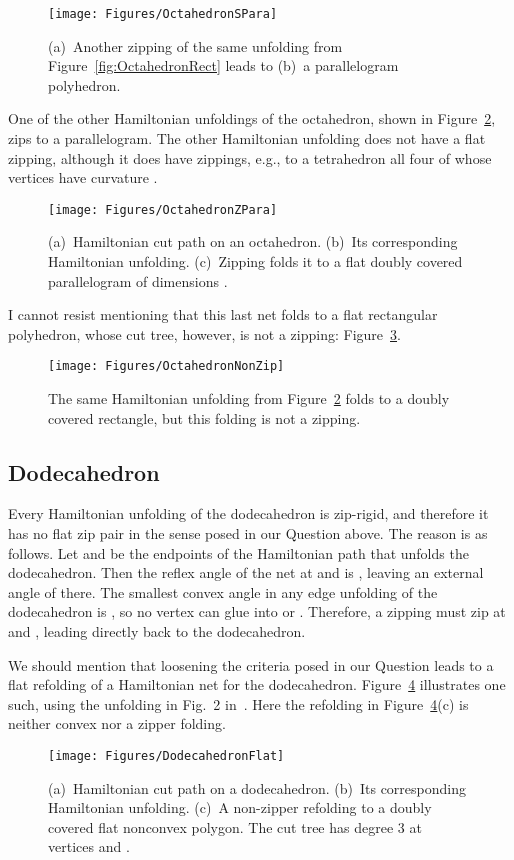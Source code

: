\pdfoutput=1  \documentclass[]{article}
\newcommand{\figlab}[1]{\label{fig:#1}}
\newcommand{\figref}[1]{\ref{fig:#1}}
\begin{document}
\begin{figure}[htbp]
\centering
\texttt{[image: Figures/OctahedronSPara]}
\caption{(a)~Another zipping of the same unfolding from
  Figure~\protect\figref{OctahedronRect}
leads to (b)~a   parallelogram polyhedron.}
\figlab{OctahedronSPara}
\end{figure}


One of the other Hamiltonian unfoldings of the octahedron,
shown in Figure~\figref{OctahedronZPara},
zips to a parallelogram.
The other Hamiltonian unfolding does not have a flat zipping,
although it does have zippings, e.g., to a tetrahedron all four of
whose
vertices have curvature .

\begin{figure}[htbp]
\centering
\texttt{[image: Figures/OctahedronZPara]}
\caption{(a)~Hamiltonian cut path on an octahedron.
(b)~Its corresponding Hamiltonian unfolding.
(c)~Zipping folds it to
a flat doubly covered parallelogram
of dimensions .}
\figlab{OctahedronZPara}
\end{figure}


I cannot resist mentioning that this last net folds to a flat rectangular
polyhedron, whose cut tree, however, is not a zipping:
Figure~\figref{OctahedronNonZip}.
\begin{figure}[htbp]
\centering
\texttt{[image: Figures/OctahedronNonZip]}
\caption{The same Hamiltonian unfolding from
  Figure~\protect\figref{OctahedronZPara}
folds to a  doubly covered rectangle,
but this folding is not a zipping.}
\figlab{OctahedronNonZip}
\end{figure}


\subsection{Dodecahedron}
Every Hamiltonian unfolding of the dodecahedron is zip-rigid,
and therefore it has no flat zip pair in the sense posed in our
Question above.
The reason is as follows.
Let  and  be the endpoints of the Hamiltonian path that unfolds
the dodecahedron.  Then the reflex angle of the net at  and 
is , leaving an external angle of
 there.
The smallest convex angle in any edge unfolding of the dodecahedron
is , so no vertex can glue into  or .
Therefore, a zipping must zip at  and , leading directly back
to the dodecahedron.

We should mention that loosening the criteria posed in our Question
leads to a flat refolding of a Hamiltonian net for the dodecahedron.
Figure~\figref{DodecahedronFlat} illustrates one such,
using the unfolding
in Fig.~2 in~\cite{lddss-zupc-10}.
Here the refolding in Figure~\figref{DodecahedronFlat}(c) is 
neither convex nor a zipper folding.
\begin{figure}[htbp]
\centering
\texttt{[image: Figures/DodecahedronFlat]}
\caption{(a)~Hamiltonian cut path on a dodecahedron.
(b)~Its corresponding Hamiltonian unfolding.
(c)~A non-zipper refolding to a doubly covered flat nonconvex polygon.
The cut tree has degree 3 at vertices  and .}
\figlab{DodecahedronFlat}
\end{figure}
\end{document}
